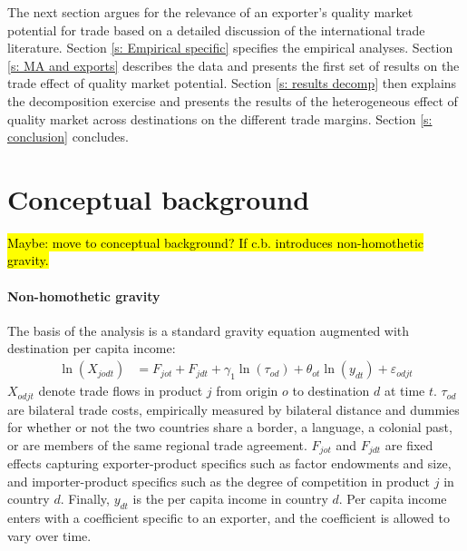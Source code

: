 \documentclass[12pt,a4paper,oneside,times]{article}   	%
\begin{document}

The next section argues for the relevance of an exporter's quality market potential for trade based on a detailed discussion of the international trade literature. Section \ref{s: Empirical specific} specifies the empirical analyses. Section \ref{s: MA and exports} describes the data and presents the first set of results on the trade effect of quality market potential. Section \ref{s: results decomp} then explains the decomposition exercise and presents the results of the heterogeneous effect of quality market across destinations on the different trade margins.  Section \ref{s: conclusion} concludes.

\section{Conceptual background}\label{s: Literature sec}


\hl{Maybe: move to conceptual background? If c.b. introduces non-homothetic gravity.}
\paragraph{Non-homothetic gravity}
The basis of the analysis is a standard gravity equation augmented with destination per capita income:
\begin{align}\label{eq:estimating equation theta}
\ln(X_{jodt})
&= F_{jot}+ F_{jdt} + \gamma_{1}\ln(\tau_{od})+\theta_{ot}\ln(y_{dt}) + \varepsilon_{odjt} 
\end{align} 
 $X_{odjt}$ denote trade flows in product $j$ from origin $o$ to destination $d$ at time $t$. $\tau_{od}$ are bilateral trade costs, empirically measured by bilateral distance and dummies for whether or not the two countries share a border, a language, a colonial past, or are members of the same regional trade agreement. $F_{jot}$ and  $F_{jdt}$ are fixed effects capturing exporter-product specifics such as factor endowments and size, and importer-product specifics such as the degree of competition in product $j$ in country $d$.  Finally, ${y}_{dt}$ is the per capita income in country $d$.  Per capita income enters with a coefficient specific to an exporter, and the coefficient is allowed to vary over time. 
 
\end{document}
